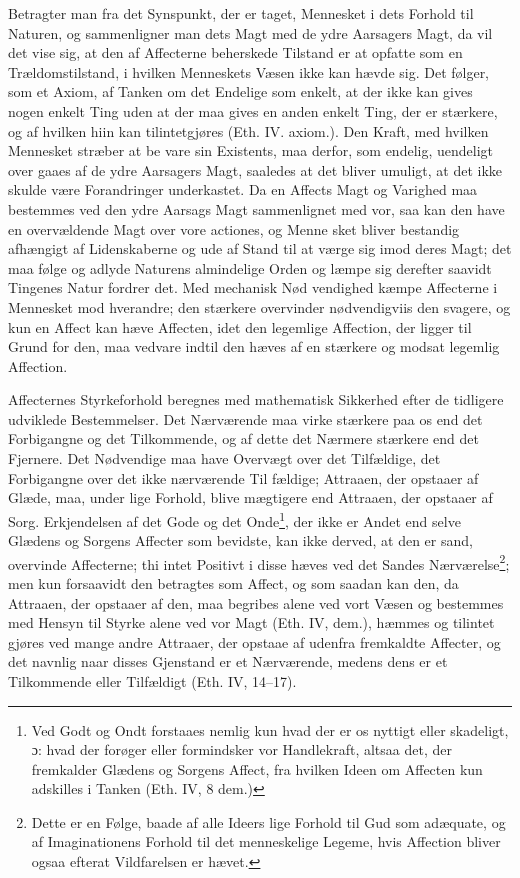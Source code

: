 \documentclass[12pt,a4paper]{book}
\newcommand{\opage}[1]{\marginnote{\footnotesize\textit{[#1]}}}
\begin{document}
Betragter man fra det Synspunkt, der er taget, Mennesket
i dets Forhold til Naturen, og sammenligner man
dets Magt med de ydre Aarsagers Magt, da vil det vise
sig, at den af Affecterne beherskede Tilstand er at opfatte
som en Trældomstilstand, i hvilken Menneskets Væsen ikke
kan hævde sig. Det følger, som et Axiom, af Tanken om
det Endelige som enkelt, at der ikke kan gives nogen enkelt
Ting uden at der maa gives en anden enkelt Ting, der er
stærkere, og af hvilken hiin kan tilintetgjøres (Eth. IV.
axiom.). Den Kraft, med hvilken Mennesket stræber at be\-%
\opage{120}\setcounter{footnote}{0}%
vare sin Existents, maa derfor, som endelig, uendeligt over\-%
gaaes af de ydre Aarsagers Magt, saaledes at det bliver
umuligt, at det ikke skulde være Forandringer underkastet.
Da en Affects Magt og Varighed maa bestemmes ved den
ydre Aarsags Magt sammenlignet med vor, saa kan den
have en overvældende Magt over vore actiones, og Menne\-%
sket bliver bestandig afhængigt af Lidenskaberne og ude af
Stand til at værge sig imod deres Magt; det maa følge og
adlyde Naturens almindelige Orden og læmpe sig derefter
saavidt Tingenes Natur fordrer det. Med mechanisk Nød\-%
vendighed kæmpe Affecterne i Mennesket mod hverandre;
den stærkere overvinder nødvendigviis den svagere, og kun
en Affect kan hæve Affecten, idet den legemlige Affection,
der ligger til Grund for den, maa vedvare indtil den hæves
af en stærkere og modsat legemlig Affection.

Affecternes Styrkeforhold beregnes med mathematisk
Sikkerhed efter de tidligere udviklede Bestemmelser. Det
Nærværende maa virke stærkere paa os end det Forbigangne
og det Tilkommende, og af dette det Nærmere stærkere end
det Fjernere. Det Nødvendige maa have Overvægt over det
Tilfældige, det Forbigangne over det ikke nærværende Til\-%
fældige; Attraaen, der opstaaer af Glæde, maa, under lige
Forhold, blive mægtigere end Attraaen, der opstaaer af Sorg.
Erkjendelsen af det Gode og det Onde\footnote{Ved Godt og Ondt forstaaes nemlig kun hvad der er os nyttigt eller
skadeligt, ɔ: hvad der forøger eller formindsker vor Handlekraft,
altsaa det, der fremkalder Glædens og Sorgens Affect, fra hvilken
Ideen om Affecten kun adskilles i Tanken (Eth. IV, 8 dem.)}, der ikke er Andet
end selve Glædens og Sorgens Affecter som bevidste, kan
ikke derved, at den er sand, overvinde Affecterne; thi intet
Positivt i disse hæves ved det Sandes Nærværelse\footnote{Dette er en Følge, baade af alle Ideers lige Forhold til Gud som
adæquate, og af Imaginationens Forhold til det menneskelige Legeme,
hvis Affection bliver ogsaa efterat Vildfarelsen er hævet.}; men
kun forsaavidt den betragtes som Affect, og som saadan
kan den, da Attraaen, der opstaaer af den, maa begribes
\opage{121} \setcounter{footnote}{0}%
alene ved vort Væsen og bestemmes med Hensyn til Styrke
alene ved vor Magt (Eth. IV, dem.), hæmmes og tilintet\-%
gjøres ved mange andre Attraaer, der opstaae af udenfra
fremkaldte Affecter, og det navnlig naar disses Gjenstand
er et Nærværende, medens dens er et Tilkommende eller
Tilfældigt (Eth. IV, 14--17).
\end{document}
